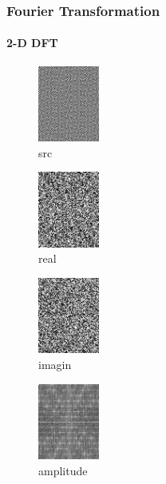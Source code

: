 \documentclass[11 pt,t]{beamer}
\begin{document}
\begin{frame}
\frametitle{Fourier Transformation}
\framesubtitle{2-D DFT}
\begin{minipage}[t]{0.3\linewidth}
\begin{figure}
   \includegraphics[width=2cm]{wrong/src.png}
\caption{src}
 \end{figure}
        \end{minipage}
\begin{minipage}[t]{0.3\linewidth}
\begin{figure}
   \includegraphics[width=2cm]{wrong/dft_real}
\caption{real}
 \end{figure}
        \end{minipage}
\begin{minipage}[t]{0.3\linewidth}
\begin{figure}
   \includegraphics[width=2cm]{wrong/dft_imagin}
\caption{imagin}
 \end{figure}
        \end{minipage}
\begin{minipage}[t]{0.3\linewidth}
\begin{figure}
   \includegraphics[width=2cm]{wrong/dft_mag}
\caption{amplitude}
 \end{figure}
        \end{minipage}
\begin{minipage}[t]{0.3\linewidth}

\end{minipage}
\end{frame}
\end{document}
